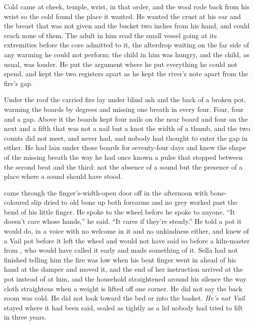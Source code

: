 Cold came at cheek, temple, wrist, in that order, and the wool rode back from his wrist so the cold found the place it wanted. He wanted the crust at his ear and the breast that was not given and the bucket two inches from his hand, and could reach none of them. The adult in him read the small vessel going at its extremities before the core admitted to it, the afterdrop waiting on the far side of any warming he could not perform; the child in him was hungry, and the child, as usual, was louder. He put the argument where he put everything he could not spend, and kept the two registers apart as he kept the river's note apart from the fire's gap.

\scenebreak

Under the  roof the carried fire lay under blind ash and the back of a broken pot, warming the boards by degrees and missing one breath in every four. Four, four and a gap. Above it the boards kept four nails on the near board and four on the next and a fifth that was not a nail but a knot the width of a thumb, and the two counts did not meet, and never had, and nobody had thought to enter the gap in either. He had lain under those boards for seventy-four days and knew the shape of the missing breath the way he had once known a pulse that stopped between the second beat and the third: not the absence of a sound but the presence of a place where a sound should have stood.

 came through the finger's-width-open door off  in the afternoon with bone-coloured slip dried to old bone up both forearms and no grey worked past the bend of his little finger. He spoke to the wheel before he spoke to anyone. “It doesn't care whose hands,” he said. “It cares if they're steady.” He told a pot it would do, in a voice with no welcome in it and no unkindness either, and knew  of a Vail pot before it left the wheel and would not have said so before a kiln-master from , who would have called it early and made something of it. Sella had not finished telling him the fire was low when his bent finger went in ahead of his hand at the damper and moved it, and the end of her instruction arrived at the pot instead of at him, and the household straightened around his silence the way cloth straightens when a weight is lifted off one corner. He did not say the back room was cold. He did not look toward the bed or into the basket. \emph{He's not Vail} stayed where it had been said, sealed as tightly as a lid nobody had tried to lift in three years.

